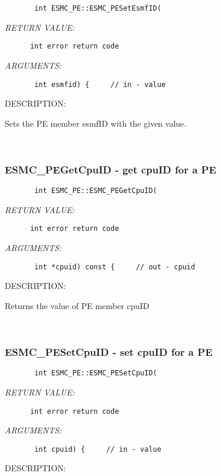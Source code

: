   
\begin{verbatim}       int ESMC_PE::ESMC_PESetEsmfID(\end{verbatim}{\em RETURN VALUE:}
\begin{verbatim}      int error return code\end{verbatim}{\em ARGUMENTS:}
\begin{verbatim}       int esmfid) {     // in - value\end{verbatim}
{\sf DESCRIPTION:\\ }


       Sets the PE member esmfID with the given value.
   
 
\mbox{}\hrulefill\ 
 
\subsubsection{ESMC\_PEGetCpuID - get cpuID for a PE}


  
\begin{verbatim}       int ESMC_PE::ESMC_PEGetCpuID(\end{verbatim}{\em RETURN VALUE:}
\begin{verbatim}      int error return code\end{verbatim}{\em ARGUMENTS:}
\begin{verbatim}       int *cpuid) const {     // out - cpuid\end{verbatim}
{\sf DESCRIPTION:\\ }


       Returns the value of PE member cpuID
   
 
\mbox{}\hrulefill\ 
 
\subsubsection{ESMC\_PESetCpuID - set cpuID for a PE}


  
\begin{verbatim}       int ESMC_PE::ESMC_PESetCpuID(\end{verbatim}{\em RETURN VALUE:}
\begin{verbatim}      int error return code\end{verbatim}{\em ARGUMENTS:}
\begin{verbatim}       int cpuid) {     // in - value\end{verbatim}
{\sf DESCRIPTION:\\ }


